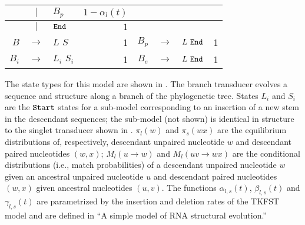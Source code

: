 \documentclass[10pt]{article}
\begin{document}
\begin{table}[!ht]
\begin{tabular}{|rcl|r||rcl|r|}
    & $|$ & $B_p$ & $1-\alpha_l(t)$ & & & &  \\ \hline
    & $|$ & $\mathtt{End}$ & $1$ & & & &  \\ \hline \hline
    $B$ & $\rightarrow$ & $L \,\, S$ & 1 & $B_p$ & $\rightarrow$ & $L \, \, \mathtt{End}$ & 1 \\ \hline
    $B_i$ & $\rightarrow$ & $L_i \,\, S_i$ & 1 & $B_e$ & $\rightarrow$ & $L \, \, \mathtt{End}$ & 1 \\ \hline \hline
  \end{tabular}
  \begin{flushleft}
    The state types for this model are shown in
    . The branch transducer evolves a
    sequence and structure along a branch of the phylogenetic
    tree. States $L_i$ and $S_i$ are the $\mathtt{Start}$ states for a
    sub-model corresponding to an insertion of a new stem in the
    descendant sequences; the sub-model (not shown) is identical in
    structure to the singlet transducer shown in
    . $\pi_l(w)$ and $\pi_s(wx)$ are the
    equilibrium distributions of, respectively, descendant unpaired
    nucleotide $w$ and descendant paired nucleotides $(w,x)$;
    $M_l(u \rightarrow w)$ and $M_l(uv \rightarrow wx)$ are the conditional distributions
    (i.e., match probabilities) of a descendant unpaired
    nucleotide $w$ given an ancestral unpaired nucleotide $u$ and
    descendant paired nucleotides $(w,x)$ given ancestral nucleotides
    $(u,v)$. The functions $\alpha_{l,s}(t)$, $\beta_{l,s}(t)$ and
    $\gamma_{l,s}(t)$ are parametrized by the insertion and deletion rates
    of the TKFST model and are defined in ``A simple model of RNA
    structural evolution.''
  \end{flushleft}
\end{table}


\end{document}
